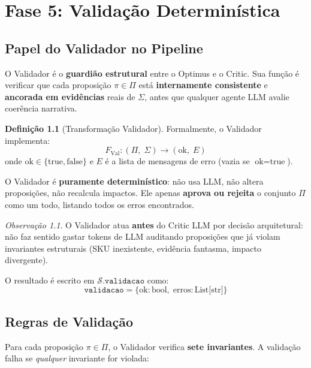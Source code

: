 \documentclass[a4paper, 12pt]{report}
\theoremstyle{definition}
\newtheorem{definicao}{Defini\c{c}\~ao}[chapter]
\theoremstyle{remark}
\newtheorem{observacao}{Observa\c{c}\~ao}[chapter]
\newcommand{\state}{\mathcal{S}}
\begin{document}
\chapter{Fase 5: Valida\c{c}\~ao Determin\'istica}

\section{Papel do Validador no Pipeline}

O Validador \'e o \textbf{guardi\~ao estrutural} entre o Optimus e o Critic.
Sua fun\c{c}\~ao \'e verificar que cada proposi\c{c}\~ao $\pi \in \Pi$
est\'a \textbf{internamente consistente} e \textbf{ancorada em evid\^encias}
reais de $\Sigma$, antes que qualquer agente LLM avalie coer\^encia narrativa.

\begin{definicao}[Transforma\c{c}\~ao Validador]
  Formalmente, o Validador implementa:
  \[
    F_{\text{Val}} : (\Pi,\; \Sigma) \to (\text{ok},\; E)
  \]
  onde $\text{ok} \in \{\text{true}, \text{false}\}$ e $E$ \'e a lista de
  mensagens de erro (vazia se $\text{ok} = \text{true}$).
\end{definicao}

\begin{caixadecisao}
  O Validador \'e \textbf{puramente determin\'istico}: n\~ao usa LLM,
  n\~ao altera proposi\c{c}\~oes, n\~ao recalcula impactos.
  Ele apenas \textbf{aprova ou rejeita} o conjunto $\Pi$ como um todo,
  listando todos os erros encontrados.
\end{caixadecisao}

\begin{observacao}
  O Validador atua \textbf{antes} do Critic LLM por decis\~ao arquitetural:
  n\~ao faz sentido gastar tokens de LLM auditando proposi\c{c}\~oes que
  j\'a violam invariantes estruturais (SKU inexistente, evid\^encia
  fantasma, impacto divergente).
\end{observacao}

O resultado \'e escrito em $\state.\texttt{validacao}$ como:
\[
  \texttt{validacao} = \{\text{ok}: \text{bool},\; \text{erros}: \text{List[str]}\}
\]


\section{Regras de Valida\c{c}\~ao}

Para cada proposi\c{c}\~ao $\pi \in \Pi$, o Validador verifica
\textbf{sete invariantes}. A valida\c{c}\~ao falha se \textit{qualquer}
invariante for violada:
\end{document}
